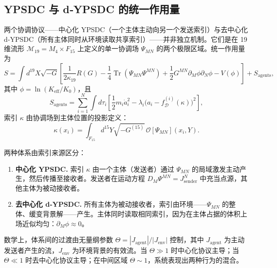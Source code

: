 \documentclass[12pt,a4paper]{article}
\DeclareMathOperator{\Tr}{Tr}
\begin{document}
	\subsection{YPSDC 与 d‑YPSDC 的统一作用量}
	\label{subsec:unified-action}
	
	两个协调协议——中心化 YPSDC（一个主体主动向另一个发送索引）与去中心化 d‑YPSDC（所有主体同时从环境读取共享索引）——并非独立机制。它们是在 19 维流形 \(\mathcal{M}_{19}=M_4\times F_{15}\) 上定义的单一协调场 \(\Psi_{MN}\) 的两个极限区域。统一作用量为
	\begin{equation}
		S = \int d^{19}X \sqrt{-G} \left[ \frac{1}{2\kappa_{19}} R(G)
		- \frac{1}{4} \Tr(\Psi_{MN}\Psi^{MN}) + \frac{1}{2} G^{MN}\partial_M\phi \partial_N\phi
		- V(\phi) \right] + S_{\mathrm{agents}},
		\label{eq:unified-S}
	\end{equation}
	其中 \(\phi = \ln(K_{\mathrm{eff}}/K_0)\)，且
	\begin{equation}
		S_{\mathrm{agents}} = \sum_{i=1}^{N} \int d\tau_i \left[ \frac{1}{2} m_i \dot a_i^2
		- \lambda_i \bigl( a_i - f_{\mathcal{D}}^{(i)}(\kappa) \bigr)^2 \right],
		\label{eq:unified-agents}
	\end{equation}
	索引 \(\kappa\) 由协调场到主体位置的投影定义：
	\begin{equation}
		\kappa(x_i) = \int_{F_{15}} d^{15}Y \sqrt{-G^{(15)}}\,
		\mathcal{O}[\Psi_{MN}](x_i, Y).
		\label{eq:unified-kappa}
	\end{equation}
	
	两种体系由索引来源区分：
	
	\begin{enumerate}[leftmargin=*, label=\textbf{(\arabic*)}]
		\item \textbf{中心化 YPSDC.} 索引 \(\kappa\) 由一个主体（发送者）通过 \(\Psi_{MN}\) 的局域激发主动产生，然后传播至接收者。发送者在运动方程 \(D_M\Psi^{MN} = J^{N}_{\mathrm{sender}}\) 中充当点源，其他主体为被动接收者。
		\item \textbf{去中心化 d‑YPSDC.} 所有主体为被动接收者，索引由环境——\(\Psi_{MN}\) 的整体、缓变背景解——产生。主体同时读取相同索引，因为在主体占据的体积上场近似均匀：\(\partial_M\phi \approx 0\)。
	\end{enumerate}
	
	数学上，体系间的过渡由无量纲参数 \(\Theta = |J_{\mathrm{agent}}| / |J_{\mathrm{env}}|\) 控制，其中 \(J_{\mathrm{agent}}\) 为主动发送者产生的流，\(J_{\mathrm{env}}\) 为环境背景的有效流。当 \(\Theta \gg 1\) 时中心化协议主导；当 \(\Theta \ll 1\) 时去中心化协议主导；在中间区域 \(\Theta \sim 1\)，系统表现出两种行为的混合。
	
\end{document}
